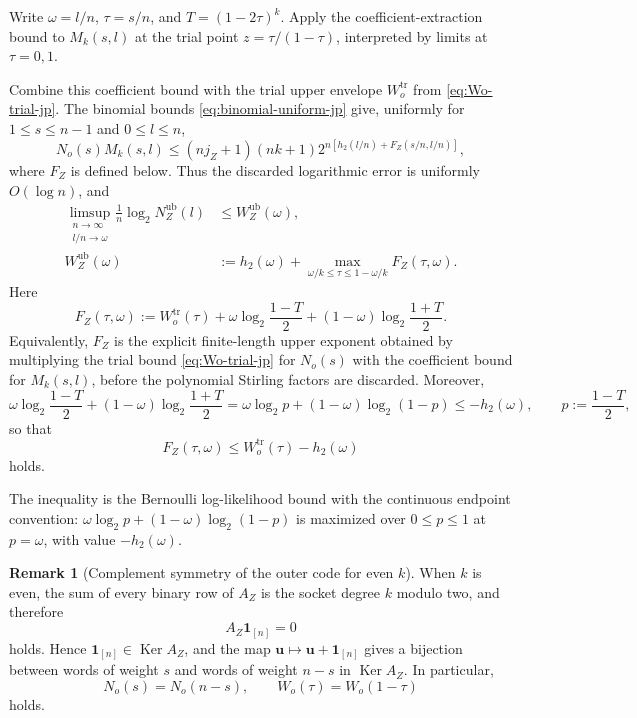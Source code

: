 \documentclass[11pt]{article}
\theoremstyle{definition}
\newtheorem*{remark*}{Remark}
\newcommand{\Ker}{\operatorname{Ker}}
\newcommand{\bu}{\mathbf u}
\newcommand{\ones}{\mathbf 1}
\newcommand{\h}{h_2}
\begin{document}
Write \(\omega=l/n\), \(\tau=s/n\), and \(T=(1-2\tau)^k\). Apply the coefficient-extraction bound to \(M_k(s,l)\) at the trial point \(z=\tau/(1-\tau)\), interpreted by limits at \(\tau=0,1\).

Combine this coefficient bound with the trial upper envelope
\(W_o^{\mathrm{tr}}\) from \eqref{eq:Wo-trial-jp}. The binomial bounds
\eqref{eq:binomial-uniform-jp} give, uniformly for \(1\le s\le n-1\)
and \(0\le l\le n\),
\[
N_o(s)M_k(s,l)\le(nj_Z+1)(nk+1)
2^{n[\h(l/n)+F_Z(s/n,l/n)]},
\]
where \(F_Z\) is defined below. Thus the discarded logarithmic error is
uniformly \(O(\log n)\), and
\begin{align}
\limsup_{\substack{n\to\infty\\l/n\to\omega}}\frac1n\log_2 N_Z^{\mathrm{ub}}(l)
&\le
W_Z^{\mathrm{ub}}(\omega),\\
W_Z^{\mathrm{ub}}(\omega)
&:=
\h(\omega)+\max_{\omega/k\le \tau\le 1-\omega/k} F_Z(\tau,\omega).
\end{align}
Here
\begin{equation}\label{eq:FZ-jp}
F_Z(\tau,\omega)
:=
W_o^{\mathrm{tr}}(\tau)
+
\omega\log_2\frac{1-T}{2}
+
(1-\omega)\log_2\frac{1+T}{2}.
\end{equation}
Equivalently, \(F_Z\) is the explicit finite-length upper exponent obtained
by multiplying the trial bound \eqref{eq:Wo-trial-jp} for \(N_o(s)\) with the coefficient
bound for \(M_k(s,l)\), before the polynomial Stirling factors are discarded.
Moreover,
\begin{equation*}
\omega\log_2\frac{1-T}{2}
+
(1-\omega)\log_2\frac{1+T}{2}
=
\omega\log_2 p+(1-\omega)\log_2(1-p)
\le -\h(\omega),
\qquad
p:=\frac{1-T}{2},
\end{equation*}
so that
\begin{equation*}
F_Z(\tau,\omega)\le W_o^{\mathrm{tr}}(\tau)-\h(\omega)
\end{equation*}
holds.

The inequality is the Bernoulli log-likelihood bound with the continuous endpoint convention:
\(\omega\log_2 p+(1-\omega)\log_2(1-p)\) is maximized over \(0\le p\le1\)
at \(p=\omega\), with value \(-\h(\omega)\).

\begin{remark*}[Complement symmetry of the outer code for even \(k\)]
When \(k\) is even, the sum of every binary row of \(A_Z\) is the
socket degree \(k\) modulo two, and therefore
\begin{equation*}
A_Z\ones_{[n]}=0
\end{equation*}
holds.
Hence \(\ones_{[n]}\in\Ker A_Z\), and the map \(\bu\mapsto \bu+\ones_{[n]}\) gives a bijection
between words of weight \(s\) and words of weight \(n-s\) in \(\Ker A_Z\).
In particular,
\begin{equation*}
N_o(s)=N_o(n-s),
\qquad
W_o(\tau)=W_o(1-\tau)
\end{equation*}
holds.
\end{remark*}
\end{document}
